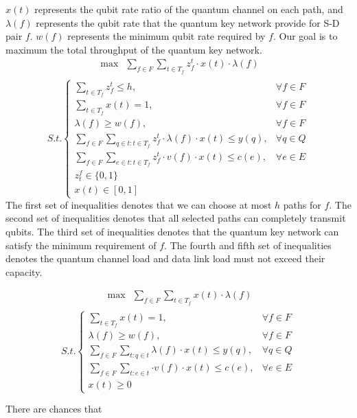 $x(t)$ represents the qubit rate ratio of the quantum channel on each path, and $\lambda(f)$ represents the qubit rate that the quantum key network provide for S-D pair $f$.  $w(f)$ represents the minimum qubit rate required by $f$. Our goal is to maximum the total throughput of the quantum key network.
\begin{equation*}
    \begin{aligned}
    \max \ \ \sum_{f \in F}\sum_{t \in T_f}{z_f^t \cdot x(t) \cdot \lambda(f)} \\
    \end{aligned}
	\end{equation*}
	\begin{equation}\label{eq:profit}
	S.t.\begin{cases}
    \sum_{t \in T_f}z_f^t \le h, & \forall f \in F \\
     \sum_{t \in T_f} x(t) = 1, & \forall f \in F \\
     \lambda(f) \ge w(f), & \forall f \in F \\
     \sum_{f \in F}\sum_{q \in t:t \in T_f}{z_f^t \cdot \lambda(f) \cdot x(t)} \le y(q), & \forall q \in Q \\
     \sum_{f \in F}\sum_{e \in t:t \in T_f}{z_f^t \cdot v(f) \cdot x(t)} \le c(e), & \forall e \in E \\
     z^f_t \in \{0,1\} \\
     x(t) \in [0,1]

	\end{cases}
\end{equation}
The first set of inequalities denotes that we can choose at most $h$ paths for $f$. The second set of inequalities denotes that all selected paths can completely transmit qubits. The third set of inequalities denotes that the quantum key network can satisfy the minimum requirement of $f$. The fourth and fifth set of inequalities denotes the quantum channel load and data link load must not exceed their capacity.

\begin{equation*}
    \begin{aligned}
    \max \ \ \sum_{f \in F}\sum_{t \in T_f}{x(t) \cdot \lambda(f)} \\
    \end{aligned}
	\end{equation*}
	\begin{equation}\label{eq:profit}
	S.t.\begin{cases}
     \sum_{t \in T_f} x(t) = 1, & \forall f \in F \\
     \lambda(f) \ge w(f), & \forall f \in F \\
     \sum_{f \in F}\sum_{t:q \in t}{\lambda(f) \cdot x(t)} \le y(q), & \forall q \in Q \\
     \sum_{f \in F}\sum_{t:e \in t}{\cdot v(f) \cdot x(t)} \le c(e), & \forall e \in E \\
     x(t) \ge 0

	\end{cases}
\end{equation}


There are chances that 